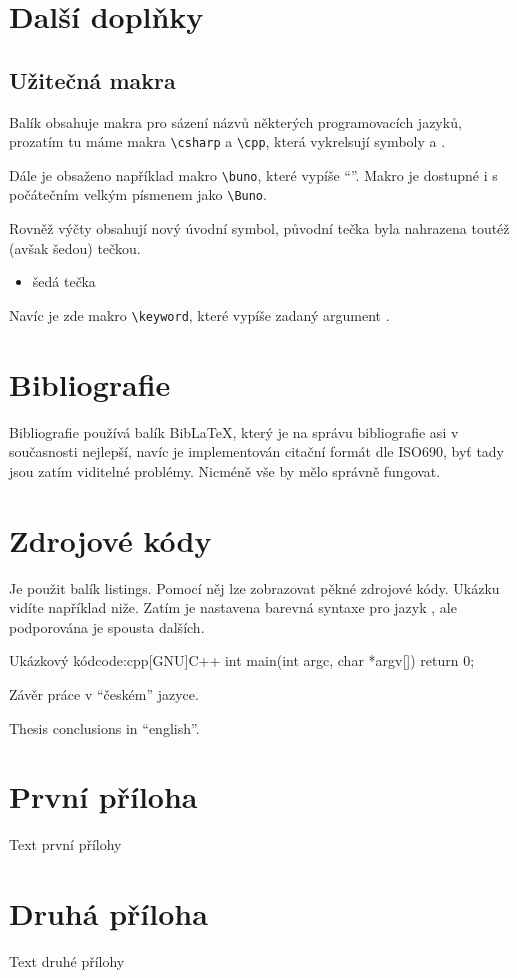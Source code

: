 \documentclass[a4paper,12pt]{article}
\begin{document}
\section{Další doplňky}
\subsection{Užitečná makra}
Balík obsahuje makra pro sázení názvů některých programovacích jazyků, prozatím tu máme makra \verb|\csharp| a \verb|\cpp|, která vykrelsují symboly \csharp a \cpp.

Dále je obsaženo například makro \verb|\buno|, které vypíše \enquote{\buno}. Makro je dostupné i s počátečním velkým písmenem jako \verb|\Buno|.

Rovněž výčty obsahují nový úvodní symbol, původní tečka byla nahrazena toutéž (avšak šedou) tečkou.
\begin{itemize}
\item šedá tečka
\end{itemize}

Navíc je zde makro \verb|\keyword|, které vypíše zadaný argument .

\section{Bibliografie}
Bibliografie používá balík Bib\LaTeX, který je na správu bibliografie asi v současnosti nejlepší, navíc je implementován citační formát dle ISO690, byť tady jsou zatím viditelné problémy. Nicméně vše by mělo správně fungovat.

\section{Zdrojové kódy}
Je použit balík listings. Pomocí něj lze zobrazovat pěkné zdrojové kódy. Ukázku vidíte například niže. Zatím je nastavena barevná syntaxe pro jazyk \cpp, ale podporována je spousta dalších. 

\begin{upcode}{Ukázkový \cpp kód}{code:cpp}{[GNU]C++}
int main(int argc, char *argv[]) {
	return 0;
}
\end{upcode}

\begin{upconclusions}[czech]
Závěr práce v \enquote{českém} jazyce.
\end{upconclusions}

\begin{upconclusions}[english]
Thesis conclusions in \enquote{english}.
\end{upconclusions}

\upprintbibliography

\upappendix
\section{První příloha}
Text první přílohy

\section{Druhá příloha}
Text druhé přílohy

\upprintindex
\end{document}
